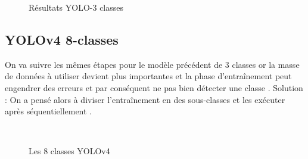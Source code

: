 {\begin{figure}[H]
    \centering
    \qquad
    \qquad
    \caption{Résultats YOLO-3 classes}
    \label{fig:example}
\end{figure}

\subsection{YOLOv4 8-classes}
On va suivre les mêmes étapes pour le modèle précédent de 3 classes or la masse de données à utiliser devient plus importantes et la phase d'entraînement peut engendrer des erreurs et par conséquent ne pas bien détecter une classe .
Solution : On a pensé alors à diviser l'entraînement en des sous-classes et les exécuter après séquentiellement .

\begin{figure}[H] 
\centering
{}\\[0.5cm]
\caption{Les 8 classes YOLOv4}
\label{fig:figure17}
\end{figure}

}
